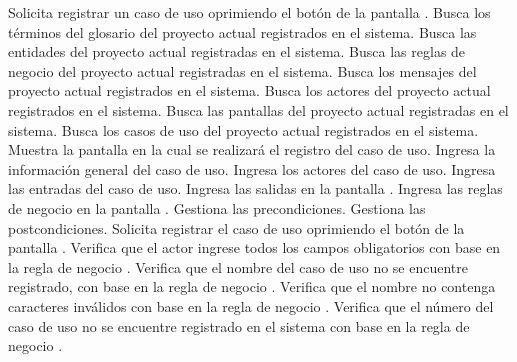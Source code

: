  \begin{UCtrayectoria}
    \UCpaso[\UCactor] Solicita registrar un caso de uso oprimiendo el botón  de la pantalla .
    \UCpaso[\UCsist] Busca los términos del glosario del proyecto actual registrados en el sistema. 
    \UCpaso[\UCsist] Busca las entidades del proyecto actual registradas en el sistema. 
    \UCpaso[\UCsist] Busca las reglas de negocio del proyecto actual registradas en el sistema. 
    \UCpaso[\UCsist] Busca los mensajes del proyecto actual registrados en el sistema. 
    \UCpaso[\UCsist] Busca los actores del proyecto actual registrados en el sistema. 
    \UCpaso[\UCsist] Busca las pantallas del proyecto actual registradas en el sistema. 
    \UCpaso[\UCsist] Busca los casos de uso del proyecto actual registrados en el sistema. 
    \UCpaso[\UCsist] Muestra la pantalla  en la cual se realizará el registro del caso de uso. 
    \UCpaso[\UCactor] Ingresa la información general del caso de uso. \label{cu5.1:ingresaDatos}
    \UCpaso[\UCactor] Ingresa los actores del caso de uso.  \label{cu5.1:ingresaActores}
    \UCpaso[\UCactor] Ingresa las entradas del caso de uso.   \label{cu5.1:ingresaEntradas}
    \UCpaso[\UCactor] Ingresa las salidas en la pantalla .    \label{cu5.1:ingresaSalidas}
    \UCpaso[\UCactor] Ingresa las reglas de negocio en la pantalla .  \label{cu5.1:ingresaReglasNegocio}
	\UCpaso[\UCactor] Gestiona las precondiciones.\label{cu5.1:ingresaPrecond}
    \UCpaso[\UCactor] Gestiona las postcondiciones.\label{cu5.1:ingresaPostcond}
    \UCpaso[\UCactor] Solicita registrar el caso de uso oprimiendo el botón  de la pantalla . 
    \UCpaso[\UCsist] Verifica que el actor ingrese todos los campos obligatorios con base en la regla de negocio  . 
	\UCpaso[\UCsist] Verifica que el nombre del caso de uso no se encuentre registrado, con base en la regla de negocio  . 
    \UCpaso[\UCsist] Verifica que el nombre no contenga caracteres inválidos con base en la regla de negocio . 
    \UCpaso[\UCsist] Verifica que el número del caso de uso no se encuentre registrado en el sistema con base en la regla de negocio  . 
    

\end{UCtrayectoria}
